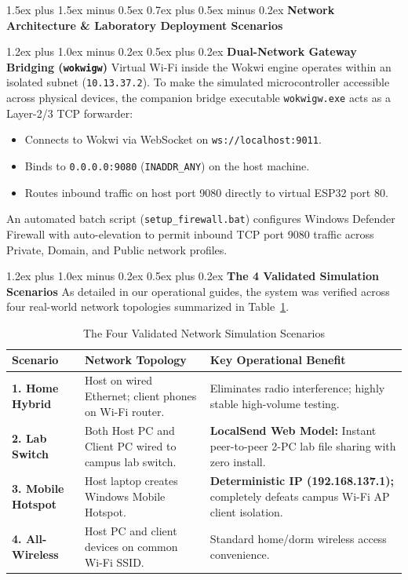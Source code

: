 ﻿\documentclass[conference]{IEEEtran}
\makeatletter
\renewcommand\section{\@startsection{section}{1}{\z@}%
  {1.5ex plus 1.5ex minus 0.5ex}%
  {0.7ex plus 0.5ex minus 0.2ex}%
  {\normalfont\normalsize\bfseries\centering}}
\renewcommand\subsection{\@startsection{subsection}{2}{\z@}%
  {1.2ex plus 1.0ex minus 0.2ex}%
  {0.5ex plus 0.2ex}%
  {\normalfont\normalsize\bfseries}}
\makeatother
\begin{document}
\section{\textbf{Network Architecture \& Laboratory Deployment Scenarios}}

\subsection{\textbf{Dual-Network Gateway Bridging (\texttt{wokwigw})}}
Virtual Wi-Fi inside the Wokwi engine operates within an isolated subnet (\texttt{10.13.37.2}). To make the simulated microcontroller accessible across physical devices, the companion bridge executable \texttt{wokwigw.exe} acts as a Layer-2/3 TCP forwarder:
\begin{itemize}
    \item Connects to Wokwi via WebSocket on \texttt{ws://localhost:9011}.
    \item Binds to \texttt{0.0.0.0:9080} (\texttt{INADDR\_ANY}) on the host machine.
    \item Routes inbound traffic on host port 9080 directly to virtual ESP32 port 80.
\end{itemize}
An automated batch script (\texttt{setup\_firewall.bat}) configures Windows Defender Firewall with auto-elevation to permit inbound TCP port 9080 traffic across Private, Domain, and Public network profiles.

\subsection{\textbf{The 4 Validated Simulation Scenarios}}
As detailed in our operational guides, the system was verified across four real-world network topologies summarized in Table~\ref{tab:scenarios}.

\begin{table}[htbp]
\caption{The Four Validated Network Simulation Scenarios}
\begin{center}
\begin{tabularx}{\columnwidth}{lXX}
\toprule
\textbf{Scenario} & \textbf{Network Topology} & \textbf{Key Operational Benefit} \\
\midrule
\textbf{1. Home Hybrid} & Host on wired Ethernet; client phones on Wi-Fi router. & Eliminates radio interference; highly stable high-volume testing. \\
\addlinespace
\textbf{2. Lab Switch} & Both Host PC and Client PC wired to campus lab switch. & \textbf{LocalSend Web Model:} Instant peer-to-peer 2-PC lab file sharing with zero install. \\
\addlinespace
\textbf{3. Mobile Hotspot} & Host laptop creates Windows Mobile Hotspot. & \textbf{Deterministic IP (192.168.137.1);} completely defeats campus Wi-Fi AP client isolation. \\
\addlinespace
\textbf{4. All-Wireless} & Host PC and client devices on common Wi-Fi SSID. & Standard home/dorm wireless access convenience. \\
\bottomrule
\end{tabularx}
\label{tab:scenarios}
\end{center}
\end{table}
\end{document}
